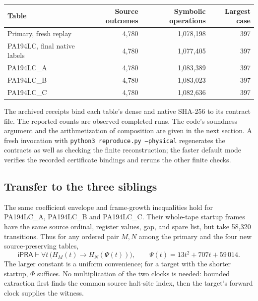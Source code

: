 \documentclass[11pt,a4paper]{article}
\newcommand{\ipra}{\mathsf{iPRA}}
\begin{document}
\begin{center}
\begin{tabular}{@{}lrrr@{}}
\toprule
Table & Source outcomes & Symbolic operations & Largest case\\
\midrule
Primary, fresh replay & 4,780 & 1,078,198 & 397\\
PA194LC, final native labels & 4,780 & 1,077,405 & 397\\
PA194LC\_A & 4,780 & 1,083,389 & 397\\
PA194LC\_B & 4,780 & 1,083,023 & 397\\
PA194LC\_C & 4,780 & 1,082,636 & 397\\
\bottomrule
\end{tabular}
\end{center}

The archived receipts bind each table's dense and native SHA-256 to its
contract file. The reported counts are observed completed runs. The
code's soundness argument and the arithmetization of composition are
given in the next section. A fresh invocation with
\texttt{python3 reproduce.py --physical} regenerates the contracts as well
as checking the finite reconstruction; the faster default mode verifies
the recorded certificate bindings and reruns the other finite checks.



\subsection{Transfer to the three siblings}

The same coefficient envelope and frame-growth inequalities hold for
PA194LC\_A, PA194LC\_B and PA194LC\_C. Their whole-tape startup frames
have the same source ordinal, register values, gap, and spare list, but
take 58,320 transitions. Thus for any ordered pair $M,N$ among the
primary and the four new source-preserving tables,
\[
\ipra\vdash\forall t\,
\bigl(H_M(t)\longrightarrow H_N(\Psi(t))\bigr),
\qquad
\boxed{\Psi(t)=13t^2+707t+59\,014.}
\]
The larger constant is a uniform convenience; for a target with the
shorter startup, $\Phi$ suffices. No multiplication of the two clocks is
needed: bounded extraction first finds the common source halt-site
index, then the target's forward clock supplies the witness.






\end{document}
